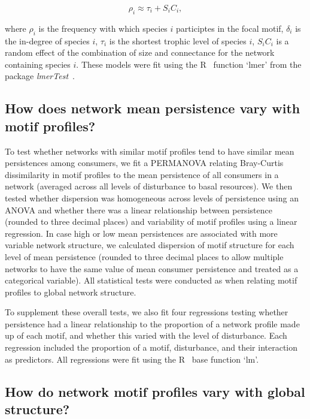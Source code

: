 \documentclass[12pt]{article}
\begin{document}
\begin{spacing}{2.0}
        \begin{equation}
            \rho_{i} \approx \tau_{i} + S_{i}C_{i} ,
            \label{partic_deg}
        \end{equation}
        
        where $\rho_{i}$ is the frequency with which species $i$ participtes in the focal motif, $\delta_{i}$ is the in-degree of species $i$, $\tau_{i}$ is the shortest trophic level of species $i$, $S_{i}C_{i}$ is a random effect of the combination of size and connectance for the network containing species $i$.
        These models were fit using the R~\citep{R} function `lmer' from the package \emph{lmerTest}~\citep{lmerTest}.

    		
    \subsection{How does network mean persistence vary with motif profiles?}

        To test whether networks with similar motif profiles tend to have similar mean persistences among consumers, we fit a PERMANOVA relating Bray-Curtis dissimilarity in motif profiles to the mean persistence of all consumers in a network (averaged across all levels of disturbance to basal resources).
        We then tested whether dispersion was homogeneous across levels of persistence using an ANOVA and whether there was a linear relationship between persistence (rounded to three decimal places) and variability of motif profiles using a linear regression.
        In case high or low mean persistences are associated with more variable network structure, we calculated dispersion of motif structure for each level of mean persistence (rounded to three decimal places to allow multiple networks to have the same value of mean consumer persistence and treated as a categorical variable). 
        All statistical tests were conducted as when relating motif profiles to global network structure.
        
        
        To supplement these overall tests, we also fit four regressions testing whether persistence had a linear relationship to the proportion of a network profile made up of each motif, and whether this varied with the level of disturbance.
        Each regression included the proportion of a motif, disturbance, and their interaction as predictors.
        All regressions were fit using the R~\citep{R} base function `lm'.
    

    \subsection{How do network motif profiles vary with global structure?}
    

\end{spacing}
\end{document}
